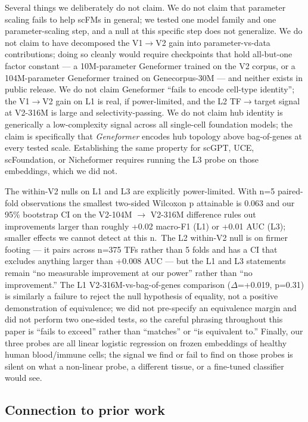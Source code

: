 \documentclass[
  11pt,
]{article}
\begin{document}
Several things we deliberately do not claim. We do not claim that
parameter scaling fails to help scFMs in general; we tested one model
family and one parameter-scaling step, and a null at this specific step
does not generalize. We do not claim to have decomposed the V1$\to$V2 gain
into parameter-vs-data contributions; doing so cleanly would require
checkpoints that hold all-but-one factor constant --- a 10M-parameter
Geneformer trained on the V2 corpus, or a 104M-parameter Geneformer
trained on Genecorpus-30M --- and neither exists in public release. We
do not claim Geneformer ``fails to encode cell-type identity''; the
V1$\to$V2 gain on L1 is real, if power-limited, and the L2 TF$\to$target signal
at V2-316M is large and selectivity-passing. We do not claim hub
identity is generically a low-complexity signal across all single-cell
foundation models; the claim is specifically that \emph{Geneformer}
encodes hub topology above bag-of-genes at every tested scale.
Establishing the same property for scGPT, UCE, scFoundation, or
Nicheformer requires running the L3 probe on those embeddings, which we
did not.

The within-V2 nulls on L1 and L3 are explicitly power-limited. With n=5
paired-fold observations the smallest two-sided Wilcoxon p attainable is
0.063 and our 95\% bootstrap CI on the V2-104M $\to$ V2-316M difference
rules out improvements larger than roughly +0.02 macro-F1 (L1) or +0.01
AUC (L3); smaller effects we cannot detect at this n.~The L2 within-V2
null is on firmer footing --- it pairs across n=375 TFs rather than 5
folds and has a CI that excludes anything larger than +0.008 AUC --- but
the L1 and L3 statements remain ``no measurable improvement at our
power'' rather than ``no improvement.'' The L1 V2-316M-vs-bag-of-genes
comparison ($\Delta$=+0.019, p=0.31) is similarly a failure to reject the null
hypothesis of equality, not a positive demonstration of equivalence; we
did not pre-specify an equivalence margin and did not perform two
one-sided tests, so the careful phrasing throughout this paper is
``fails to exceed'' rather than ``matches'' or ``is equivalent to.''
Finally, our three probes are all linear logistic regression on frozen
embeddings of healthy human blood/immune cells; the signal we find or
fail to find on those probes is silent on what a non-linear probe, a
different tissue, or a fine-tuned classifier would see.

\subsection{Connection to prior
work}\label{connection-to-prior-work}
\end{document}
